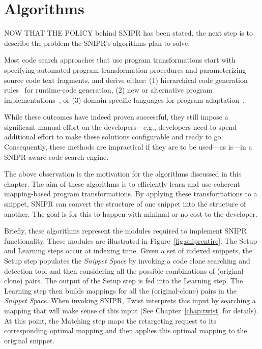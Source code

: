 \chapter{Algorithms}{}
\label{chap:algorithms}

\lettrine[lraise=0.1, nindent=0em, slope=-.5em]{N}{OW THAT THE POLICY} behind \uppercase{SNIPR} has been stated, the next step is to describe the problem the SNIPR's algorithms plan to solve.
% 

Most code search approaches that use program transformations start with specifying automated program transformation procedures and parameterizing source code text fragments, and derive either: (1) hierarchical code generation rules~\cite{Nita:2010en} for runtime-code generation, (2) new or alternative program implementations~\cite{Wightman:2012gc}, or (3) domain specific languages for program adaptation~\cite{Visser:2001tc}.

While these outcomes have indeed proven successful, they still impose a significant manual effort on the developers---e.g., developers need to spend additional effort to make these solutions configurable and ready to go. Consequently, these methods are impractical if they are to be used---as is---in a \uppercase{SNIPR}-aware code search engine. 

The above observation is the motivation for the algorithms discussed in this chapter. The aim of these algorithms is to efficiently learn and use coherent mapping-based program transformations. By applying these transformations to a snippet, \uppercase{SnipR} can convert the structure of one snippet into the structure of another. The goal is for this to happen with minimal or no cost to the developer.

Briefly, these algorithms represent the modules required to implement \uppercase{SnipR} functionality. These modules are illustrated in Figure~\ref{fig:sniprentire}. The Setup and Learning steps occur at indexing time. Given a set of indexed snippets, the Setup step populates the \emph{Snippet Space} by invoking a code clone searching and detection tool and then considering all the possible combinations of (original-clone) pairs. The output of the Setup step is fed into the Learning step. The Learning step then builds mappings for all the (original-clone) pairs in the \emph{Snippet Space}. When invoking \uppercase{SnipR}, Twist interprets this input by searching a mapping that will make sense of this input (See Chapter~\ref{chap:twist} for details). At this point, the Matching step maps the retargeting request to its corresponding optimal mapping and then applies this optimal mapping to the original snippet.

